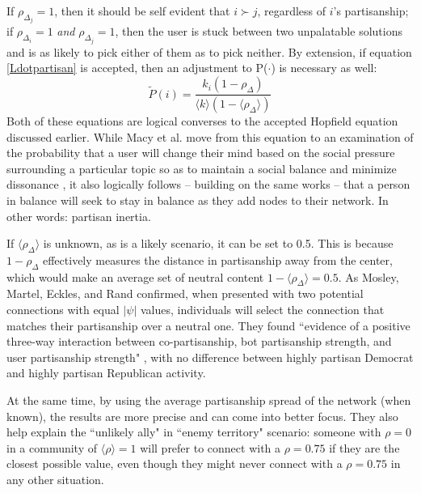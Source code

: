\documentclass[preprint,review,12pt]{elsarticle}
\begin{document}
If $\rho_{\Delta_j} = 1$, then it should be self evident that $i \succ j$, regardless of $i$'s partisanship; if $\rho_{\Delta_i} = 1$ \textit{and} $\rho_{\Delta_j} = 1$, then the user is stuck between two unpalatable solutions and is as likely to pick either of them as to pick neither. By extension, if equation \ref{Ldotpartisan} is accepted, then an adjustment to P($\cdot$) is necessary as well:
\begin{equation}
\label{Pdotpartisan}
        \tilde{P}(i)= \frac{k_i(1-\rho_{\Delta})}{\langle k \rangle  (1-\langle\rho_{\Delta}\rangle) }
\end{equation}
Both of these equations are logical converses to the accepted Hopfield equation discussed earlier. While Macy et al. move from this equation to an examination of the probability that a user will change their mind based on the social pressure surrounding a particular topic so as to maintain a social balance and minimize dissonance \cite{macy2003polarization}, it also logically follows -- building on the same works \cite{kitts1999structural,heider1982psychology,cartwright1956structural,hopfield1982neural,hopfield1985neural,nowak1998toward} -- that a person in balance will seek to stay in balance as they add nodes to their network. In other words: partisan inertia.

If $\langle \rho_{\Delta} \rangle$ is unknown, as is a likely scenario, it can be set to 0.5. This is because $1 - \rho_{\Delta}$ effectively measures the distance in partisanship away from the center, which would make an average set of neutral content $ 1 - \langle\rho_{\Delta} \rangle = 0.5$. As Mosley, Martel, Eckles, and Rand confirmed, when presented with two potential connections with equal $|\psi|$ values, individuals will select the connection that matches their partisanship over a neutral one. They found ``evidence of a positive three-way interaction between co-partisanship, bot partisanship strength, and user partisanship strength" \cite{mosleh2020shared}, with no difference between highly partisan Democrat and highly partisan Republican activity. 

At the same time, by using the average partisanship spread of the network (when known), the results are more precise and can come into better focus. They also help explain the ``unlikely ally" in ``enemy territory" scenario: someone with $\rho = 0$ in a community of $\langle \rho \rangle=1$ will prefer to connect with a $\rho = 0.75$ if they are the closest possible value, even though they might never connect with a $\rho = 0.75$ in any other situation. 
\end{document}

